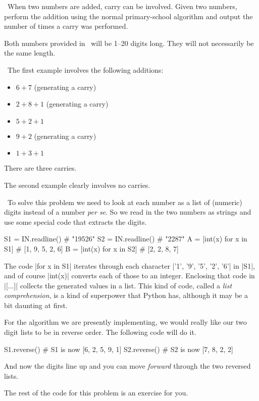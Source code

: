
\Question\ When two numbers are added, carry can be involved. Given two numbers, perform
the addition using the normal primary-school algorithm and output the number of times a
carry was performed.

Both numbers provided in \IN\ will be 1--20 digits long. They will not necessarily be the
same length.

\Sample


\Explanation\ The first example involves the following additions:
\begin{itemize}
  \item $6+7$ (generating a carry)
  \item $2+8+1$ (generating a carry)
  \item $5+2+1$
  \item $9+2$ (generating a carry)
  \item $1+3+1$
\end{itemize}

There are three carries.

The second example clearly involves no carries.

\Scratch\ To solve this problem we need to look at each number as a list of (numeric)
digits instead of a number \emph{per se}. So we read in the two numbers as strings and use
some special code that extracts the digits.

\begin{pythoncode}
  S1 = IN.readline()            # "19526"
  S2 = IN.readline()            # "2287"
  A = [int(x) for x in S1]      # [1, 9, 5, 2, 6]
  B = [int(x) for x in S2]      # [2, 2, 8, 7]
\end{pythoncode}

The code \pycode|for x in S1| iterates through each character \pycode|'1', '9', '5', '2',
'6'| in \pycode|S1|, and of course \pycode|int(x)| converts each of those to an integer.
Enclosing that code in \pycode|[...]| collects the generated values in a list. This kind
of code, called a \emph{list comprehension}, is a kind of superpower that Python has,
although it may be a bit daunting at first.

For the algorithm we are presently implementing, we would really like our two digit lists
to be in reverse order. The following code will do it.

\begin{pythoncode} 
  S1.reverse()                  # S1 is now [6, 2, 5, 9, 1]
  S2.reverse()                  # S2 is now [7, 8, 2, 2]
\end{pythoncode}

And now the digits line up and you can move \emph{forward} through the two reversed lists.

\Solution The rest of the code for this problem is an exercise for you.


